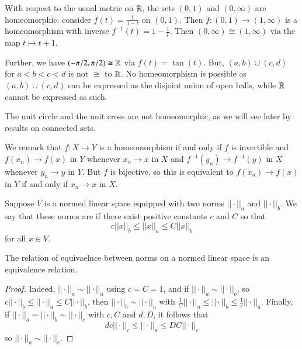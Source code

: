 \begin{eg}
    With respect to the usual metric on $\mathbb R$, the sets $(0,1)$ and $(0,\infty)$ are homeomorphic. consider $f(t) = \frac{1}{1-t}$ on $(0,1)$. Then $f:(0,1)\rightarrow (1,\infty)$ is a homeomorphism with inverse $f^{-1}(t) = 1 - \frac{1}{t}$. Then $(0,\infty)\cong (1,\infty)$ via the map $t\mapsto t+1$. 

    Further, we have $(-\pi/2,\pi/2)\cong \mathbb R$ via $f(t) = \tan(t)$. But, $(a,b)\cup(c,d)$ for $a < b < c < d$ is not $\cong$ to $\mathbb R$. No homeomorphism is possible as $(a,b) \cup (c,d)$ can be expressed as the disjoint union of open balls, while $\mathbb R$ cannot be expressed as such.
\end{eg}


\begin{eg}
    The unit circle and the unit cross are not homeomorphic, as we will see later by results on connected sets.
\end{eg}

We remark that $f:X\rightarrow Y$ is a homeomorphism if and only if $f$ is invertible and $f(x_n)\rightarrow f(x)$ in $Y$ whenever $x_n\rightarrow x$ in $X$ and $f^{-1}(y_n)\rightarrow f^{-1}(y)$ in $X$ whenever $y_n\rightarrow y$ in $Y$. But $f$ is bijective, so this is equivalent to $f(x_n)\rightarrow f(x)$ in $Y$ if and only if $x_n\rightarrow x$ in $X$.

\begin{defn}
    Suppose $V$ is a normed linear space equipped with two norms $||\cdot ||_a$ and $||\cdot||_b$. We say that these norms are  if there exist positive constants $c$ and $C$ so that $$c||x||_b \leq ||x||_a\leq C||x||_b$$ for all $x \in V$.
\end{defn}

\begin{prop}
    The relation of equivaelnce between norms on a normed linear space is an equivalence relation.
\end{prop}
\begin{proof}
    Indeed, $||\cdot||_a \sim ||\cdot||_a$ using $c = C = 1$, and if $||\cdot||_a\sim||\cdot ||_b$, so $c||\cdot||_b \leq ||\cdot||_a \leq C||\cdot||_b$, then $||\cdot||_b\sim||\cdot||_a$ with $\frac{1}{C}||\cdot||_a \leq ||\cdot||_b\leq \frac{1}{c}||\cdot ||_a$. Finally, if $||\cdot||_a\sim||\cdot||_b\sim||\cdot||_c$ with $c,C$ and $d,D$, it follows that $$dc||\cdot||_c \leq ||\cdot||_a\leq DC||\cdot||_c$$ so $||\cdot||_a\sim||\cdot||_c$.
\end{proof}

